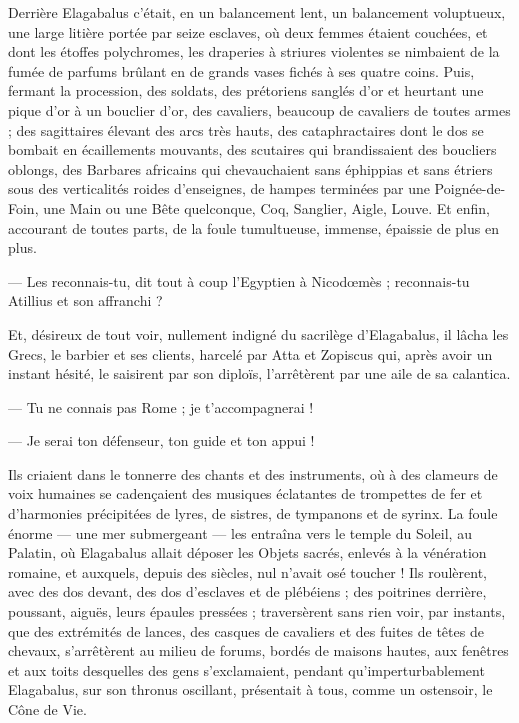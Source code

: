 \documentclass[a4paper, 11pt, oneside, polutonikogreek, french]{article}
\begin{document}
Derrière Elagabalus c'était, en un balancement lent, un balancement voluptueux, une large litière portée par seize esclaves, où deux femmes étaient couchées, et dont les étoffes polychromes, les draperies à striures violentes se nimbaient de la fumée de parfums brûlant en de grands vases fichés à ses quatre coins. Puis, fermant la procession, des soldats, des prétoriens sanglés d'or et heurtant une pique d'or à un bouclier d'or, des cavaliers, beaucoup de cavaliers de toutes armes ; des sagittaires élevant des arcs très hauts, des cataphractaires dont le dos se bombait en écaillements mouvants, des scutaires qui brandissaient des boucliers oblongs, des Barbares africains qui chevauchaient sans éphippias et sans étriers sous des verticalités roides d'enseignes, de hampes terminées par une Poignée-de-Foin, une Main ou une Bête quelconque, Coq, Sanglier, Aigle, Louve. Et enfin, accourant de toutes parts, de la foule tumultueuse, immense, épaissie de plus en plus.

--- Les reconnais-tu, dit tout à coup l'Egyptien à Nicodœmès ; reconnais-tu Atillius et son affranchi ?

Et, désireux de tout voir, nullement indigné du sacrilège d'Elagabalus, il lâcha les Grecs, le barbier et ses clients, harcelé par Atta et Zopiscus qui, après avoir un instant hésité, le saisirent par son diploïs, l'arrêtèrent par une aile de sa calantica.

--- Tu ne connais pas Rome ; je t'accompagnerai !

--- Je serai ton défenseur, ton guide et ton appui !

Ils criaient dans le tonnerre des chants et des instruments, où à des clameurs de voix humaines se cadençaient des musiques éclatantes de trompettes de fer et d'harmonies précipitées de lyres, de sistres, de tympanons et de syrinx. La foule énorme --- une mer submergeant --- les entraîna vers le temple du Soleil, au Palatin, où Elagabalus allait déposer les Objets sacrés, enlevés à la vénération romaine, et auxquels, depuis des siècles, nul n'avait osé toucher ! Ils roulèrent, avec des dos devant, des dos d'esclaves et de plébéiens ; des poitrines derrière, poussant, aiguës, leurs épaules pressées ; traversèrent sans rien voir, par instants, que des extrémités de lances, des casques de cavaliers et des fuites de têtes de chevaux, s'arrêtèrent au milieu de forums, bordés de maisons hautes, aux fenêtres et aux toits desquelles des gens s'exclamaient, pendant qu'imperturbablement Elagabalus, sur son thronus oscillant, présentait à tous, comme un ostensoir, le Cône de Vie.
\end{document}
